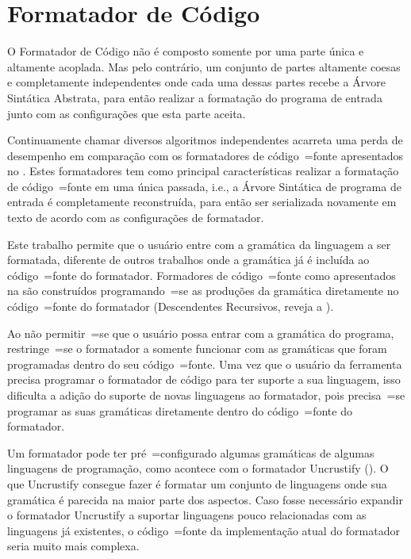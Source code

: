 \section{Formatador de Código}
\label{section:desempenhoDoFormator}

O Formatador de Código não é composto somente por uma parte única e
altamente acoplada.
Mas pelo contrário,
um conjunto de partes altamente coesas e
completamente independentes onde cada uma dessas partes recebe a Árvore Sintática Abstrata,
para então realizar a formatação do programa de entrada junto com as configurações que esta parte aceita.

Continuamente chamar diversos algoritmos independentes acarreta uma perda de desempenho em comparação com os formatadores de código~=fonte apresentados no .
Estes formatadores tem como principal características realizar a formatação de código~=fonte em uma única passada,
i.e.,
a Árvore Sintática de programa de entrada é completamente reconstruída,
para então ser serializada novamente em texto de acordo com as configurações de formatador.

Este trabalho permite que o usuário entre com a gramática da linguagem a ser formatada,
diferente de outros trabalhos onde a gramática já é incluída ao código~=fonte do formatador.
Formadores de código~=fonte como apresentados na  são construídos programando~=se as produções da gramática diretamente no código~=fonte do formatador (Descendentes Recursivos,
reveja a ).

Ao não permitir~=se que o usuário possa entrar com a gramática do programa,
restringe~=se o formatador a somente funcionar com as gramáticas que foram programadas dentro do seu código~=fonte.
Uma vez que o usuário da ferramenta precisa programar o formatador de código para ter suporte a sua linguagem,
isso dificulta a adição do suporte de novas linguagens ao formatador,
pois precisa~=se programar as suas gramáticas diretamente dentro do código~=fonte do formatador.

Um formatador pode ter pré~=configurado algumas gramáticas de algumas linguagens de programação,
como acontece com o formatador Uncrustify ().
O que Uncrustify consegue fazer é formatar um conjunto de linguagens onde sua gramática é parecida na maior parte dos aspectos.
Caso fosse necessário expandir o formatador Uncrustify a suportar linguagens pouco relacionadas com as linguagens já existentes,
o código~=fonte da implementação atual do formatador seria muito mais complexa.

